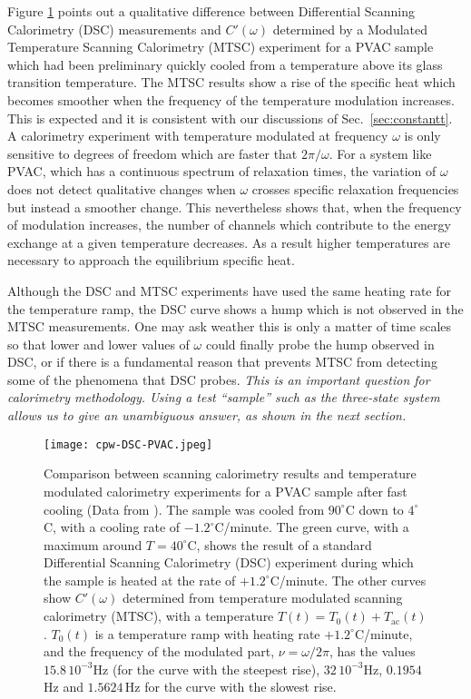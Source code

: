 \documentclass[pre,a4paper,twocolumn,superscriptaddress,%
floatfix]{revtex4}
\newcommand{\tac}{\ensuremath{T_{\mathrm{ac}}}}
\begin{document}
Figure \ref{fig:pvac} points out a qualitative difference between
Differential Scanning Calorimetry (DSC) measurements and $C'(\omega)$
determined by a Modulated Temperature Scanning Calorimetry (MTSC) experiment
for a PVAC sample which had been preliminary quickly cooled from a temperature
above its glass transition temperature. The MTSC results show a rise of the
specific heat which becomes smoother when the frequency of the temperature
modulation increases. This is expected and it is consistent with our
discussions of Sec.~\ref{sec:constantt}.
A calorimetry experiment with temperature modulated at frequency 
$\omega$ is only sensitive to degrees of freedom
which are faster that $2\pi / \omega$. For a system like PVAC, which has a
continuous spectrum of relaxation times, the variation of $\omega$ does not
detect qualitative changes when $\omega$ crosses specific relaxation
frequencies but instead a smoother change. This nevertheless shows that, when
the frequency of modulation increases, the number of channels which contribute
to the energy exchange at a given temperature decreases. As a result higher
temperatures are necessary to approach the equilibrium specific heat.

Although the DSC and MTSC experiments
have used the same heating rate for the temperature ramp, the DSC curve shows
a hump which is not observed in the MTSC measurements. One may ask weather this
is only a matter of time scales so that lower and lower values of $\omega$
could finally probe the hump observed in DSC, or if there is a fundamental
reason that prevents MTSC from detecting some of the phenomena that DSC
probes.
{\em This is an important question for calorimetry methodology. Using a test
  ``sample'' such as the three-state system allows us to give an unambiguous
  answer, as shown in the next section.}

\begin{figure}[h]
  \centering
  \texttt{[image: cpw-DSC-PVAC.jpeg]}
  \caption{Comparison between scanning
    calorimetry results and temperature modulated calorimetry experiments for
    a PVAC 
    sample after fast cooling (Data from \cite{LAARRAJ}). 
    The sample was cooled from $90^{\circ}$C down to $4^{\circ}$C, with a
    cooling rate of $-1.2^{\circ}$C/minute.
    The green curve, with a maximum around $T=40^{\circ}$C, shows the result
    of a standard Differential Scanning Calorimetry (DSC)
    experiment during which
    the sample is heated at the rate of $+1.2^{\circ}$C/minute. The other
    curves show $C'(\omega)$ determined from temperature modulated scanning
    calorimetry (MTSC), with a temperature $T(t) = T_0(t) + \tac(t)$. $T_0(t)$
    is a temperature ramp with heating rate $+1.2^{\circ}$C/minute, and
    the frequency of the modulated part, $\nu = \omega / 2 \pi$, has the values
    $15.8\,10^{-3}$Hz (for the curve with the steepest rise), $32\,10^{-3}$Hz,
    $0.1954\,$Hz and $1.5624\,$Hz for the curve with the slowest rise.
  }
  \label{fig:pvac}
\end{figure}
\end{document}
